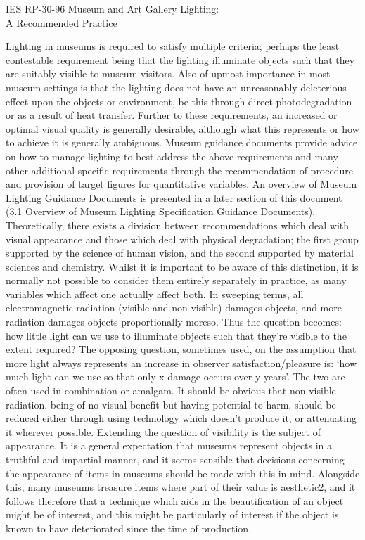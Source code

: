 \begin{flushright}IES RP-30-96 Museum and Art Gallery Lighting: \\A Recommended Practice \citep{ies_ies_1996}\end{flushright}

Lighting in museums is required to satisfy multiple criteria; perhaps the least contestable requirement being that the lighting illuminate objects such that they are suitably visible to museum visitors. Also of upmost importance in most museum settings is that the lighting does not have an unreasonably deleterious effect upon the objects or environment, be this through direct photodegradation or as a result of heat transfer. Further to these requirements, an increased or optimal visual quality is generally desirable, although what this represents or how to achieve it is generally ambiguous.
Museum guidance documents provide advice on how to manage lighting to best address the above requirements and many other additional specific requirements through the recommendation of procedure and provision of target figures for quantitative variables. An overview of Museum Lighting Guidance Documents is presented in a later section of this document (3.1 Overview of Museum Lighting Specification Guidance Documents).
Theoretically, there exists a division between recommendations which deal with visual appearance and those which deal with physical degradation; the first group supported by the science of human vision, and the second supported by material sciences and chemistry. Whilst it is important to be aware of this distinction, it is normally not possible to consider them entirely separately in practice, as many variables which affect one actually affect both.
In sweeping terms, all electromagnetic radiation (visible and non-visible) damages objects, and more radiation damages objects proportionally moreso. Thus the question becomes: how little light can we use to illuminate objects such that they're visible to the extent required? The opposing question, sometimes used, on the assumption that more light always represents an increase in observer satisfaction/pleasure is: `how much light can we use so that only x damage occurs over y years'. The two are often used in combination or amalgam. It should be obvious that non-visible radiation, being of no visual benefit but having potential to harm, should be reduced either through using technology which doesn't produce it, or attenuating it wherever possible.
Extending the question of visibility is the subject of appearance. It is a general expectation that museums represent objects in a truthful and impartial manner, and it seems sensible that decisions concerning the appearance of items in museums should be made with this in mind. Alongside this, many museums treasure items where part of their value is aesthetic2, and it follows therefore that a technique which aids in the beautification of an object might be of interest, and this might be particularly of interest if the object is known to have deteriorated since the time of production.

